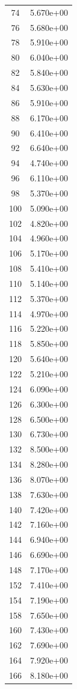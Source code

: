 \documentclass[12pt]{article}
\begin{document}
\begin{longtable}{@{}cc@{}}
74 & 5.670e+00 \\
76 & 5.680e+00 \\
78 & 5.910e+00 \\
80 & 6.040e+00 \\
82 & 5.840e+00 \\
84 & 5.630e+00 \\
86 & 5.910e+00 \\
88 & 6.170e+00 \\
90 & 6.410e+00 \\
92 & 6.640e+00 \\
94 & 4.740e+00 \\
96 & 6.110e+00 \\
98 & 5.370e+00 \\
100 & 5.090e+00 \\
102 & 4.820e+00 \\
104 & 4.960e+00 \\
106 & 5.170e+00 \\
108 & 5.410e+00 \\
110 & 5.140e+00 \\
112 & 5.370e+00 \\
114 & 4.970e+00 \\
116 & 5.220e+00 \\
118 & 5.850e+00 \\
120 & 5.640e+00 \\
122 & 5.210e+00 \\
124 & 6.090e+00 \\
126 & 6.300e+00 \\
128 & 6.500e+00 \\
130 & 6.730e+00 \\
132 & 8.500e+00 \\
134 & 8.280e+00 \\
136 & 8.070e+00 \\
138 & 7.630e+00 \\
140 & 7.420e+00 \\
142 & 7.160e+00 \\
144 & 6.940e+00 \\
146 & 6.690e+00 \\
148 & 7.170e+00 \\
152 & 7.410e+00 \\
154 & 7.190e+00 \\
158 & 7.650e+00 \\
160 & 7.430e+00 \\
162 & 7.690e+00 \\
164 & 7.920e+00 \\
166 & 8.180e+00 \\

\end{longtable}
\end{document}
